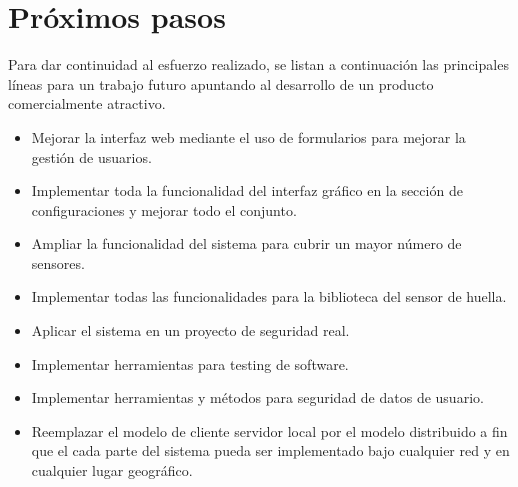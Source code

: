 \section{Próximos pasos}

Para dar continuidad al esfuerzo realizado, se listan a continuación las principales líneas para un trabajo futuro apuntando al desarrollo de un producto comercialmente atractivo.

\begin{itemize}
\item Mejorar la interfaz web mediante el uso de formularios para mejorar la gestión de usuarios.

\item Implementar toda la funcionalidad del interfaz gráfico en la sección de configuraciones y mejorar todo el conjunto.

\item Ampliar la funcionalidad del sistema para cubrir un mayor número de sensores.

\item Implementar todas las funcionalidades para la biblioteca del sensor de huella.

\item Aplicar el sistema en un proyecto de seguridad real.

\item Implementar herramientas para testing de software.

\item Implementar herramientas y métodos para seguridad de datos de usuario.

\item Reemplazar el modelo de cliente servidor local por el modelo distribuido a fin que el cada parte del sistema pueda ser implementado bajo cualquier red y en cualquier lugar geográfico.

\end{itemize}
